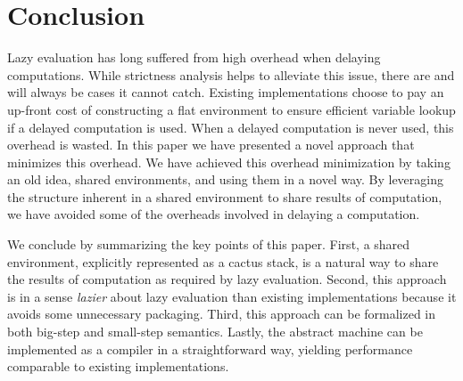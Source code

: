 \section{Conclusion} \label{sec:conc}

Lazy evaluation has long suffered from high overhead when delaying computations.
While strictness analysis helps to alleviate this issue, there are and will
always be cases it cannot catch. Existing implementations choose to pay an
up-front cost of constructing a flat environment to ensure efficient variable
lookup if a delayed computation is used. When a delayed computation is never
used, this overhead is wasted. In this paper we have presented a novel approach
that minimizes this overhead. We have achieved this overhead minimization by
taking an old idea, shared environments, and using them in a novel way. By
leveraging the structure inherent in a shared environment to share results of
computation, we have avoided some of the overheads involved in delaying a
computation. 

We conclude by summarizing the key points of this paper. First, a shared
environment, explicitly represented as a cactus stack, is a natural way to share
the results of computation as required by lazy evaluation. Second, this approach
is in a sense \emph{lazier} about lazy evaluation than existing implementations
because it avoids some unnecessary packaging. Third, this approach can be
formalized in both big-step and small-step semantics. Lastly, the abstract
machine can be implemented as a compiler in a straightforward way, yielding
performance comparable to existing implementations. 
